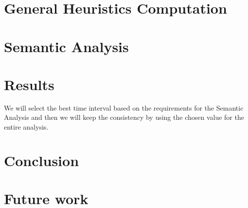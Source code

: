 \documentclass[twocolumn, 12pt]{article}
\newcommand\lei[1]{\todo[inline, color=blue!30]{#1}}
\newcommand\lucia[1]{\todo[inline, color=yellow!40]{#1}}
\begin{document}
  
  
    
\section{General Heuristics Computation}
  

\section{Semantic Analysis}
  

\section{Results}
We will select the best time interval based on the requirements for the Semantic Analysis and then we will keep the consistency by using the chosen value for the entire analysis.
  

\section{Conclusion}


\section{Future work}







\end{document}
